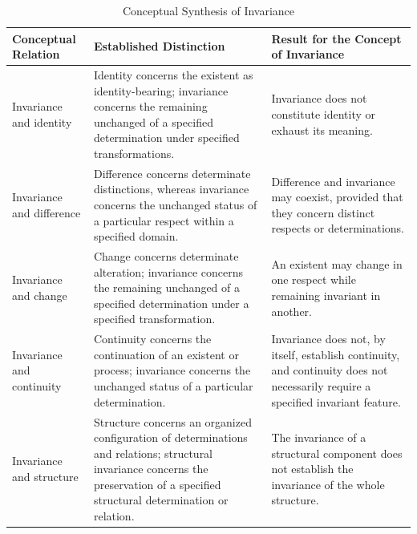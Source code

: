 
\begin{table}[htbp]
    \centering
    \caption{Conceptual Synthesis of Invariance}
    \label{tab:synthesis-of-invariance}

    \renewcommand{\arraystretch}{1.4}

    \begin{tabular}{|p{}|p{}|p{}|}
        \hline
        \textbf{Conceptual Relation} &
        \textbf{Established Distinction} &
        \textbf{Result for the Concept of Invariance} \\
        \hline

        Invariance and identity &
        Identity concerns the existent as identity-bearing; invariance concerns the remaining unchanged of a specified determination under specified transformations. &
        Invariance does not constitute identity or exhaust its meaning. \\
        \hline

        Invariance and difference &
        Difference concerns determinate distinctions, whereas invariance concerns the unchanged status of a particular respect within a specified domain. &
        Difference and invariance may coexist, provided that they concern distinct respects or determinations. \\
        \hline

        Invariance and change &
        Change concerns determinate alteration; invariance concerns the remaining unchanged of a specified determination under a specified transformation. &
        An existent may change in one respect while remaining invariant in another. \\
        \hline

        Invariance and continuity &
        Continuity concerns the continuation of an existent or process; invariance concerns the unchanged status of a particular determination. &
        Invariance does not, by itself, establish continuity, and continuity does not necessarily require a specified invariant feature. \\
        \hline

        Invariance and structure &
        Structure concerns an organized configuration of determinations and relations; structural invariance concerns the preservation of a specified structural determination or relation. &
        The invariance of a structural component does not establish the invariance of the whole structure. \\
        \hline


\end{tabular}
\end{table}
